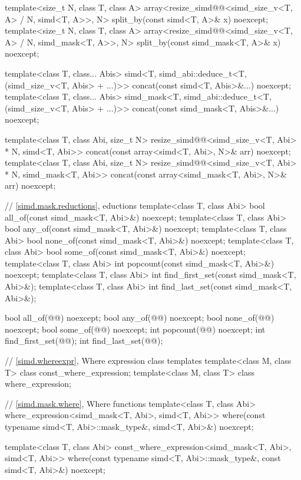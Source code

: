 \begin{codeblock}
{  template<size_t N, class T, class A>
    array<resize_simd@@<simd_size_v<T, A> / N, simd<T, A>>, N>
      split_by(const simd<T, A>& x) noexcept;
  template<size_t N, class T, class A>
    array<resize_simd@@<simd_size_v<T, A> / N, simd_mask<T, A>>, N>
      split_by(const simd_mask<T, A>& x) noexcept;

  template<class T, class... Abis>
    simd<T, simd_abi::deduce_t<T, (simd_size_v<T, Abis> + ...)>>
      concat(const simd<T, Abis>&...) noexcept;
  template<class T, class... Abis>
    simd_mask<T, simd_abi::deduce_t<T, (simd_size_v<T, Abis> + ...)>>
      concat(const simd_mask<T, Abis>&...) noexcept;

  template<class T, class Abi, size_t N>
    resize_simd@@<simd_size_v<T, Abi> * N, simd<T, Abi>>
      concat(const array<simd<T, Abi>, N>& arr) noexcept;
  template<class T, class Abi, size_t N>
    resize_simd@@<simd_size_v<T, Abi> * N, simd_mask<T, Abi>>
      concat(const array<simd_mask<T, Abi>, N>& arr) noexcept;

  // \ref{simd.mask.reductions}, eductions
  template<class T, class Abi> bool all_of(const simd_mask<T, Abi>&) noexcept;
  template<class T, class Abi> bool any_of(const simd_mask<T, Abi>&) noexcept;
  template<class T, class Abi> bool none_of(const simd_mask<T, Abi>&) noexcept;
  template<class T, class Abi> bool some_of(const simd_mask<T, Abi>&) noexcept;
  template<class T, class Abi> int popcount(const simd_mask<T, Abi>&) noexcept;
  template<class T, class Abi> int find_first_set(const simd_mask<T, Abi>&);
  template<class T, class Abi> int find_last_set(const simd_mask<T, Abi>&);

  bool all_of(@@) noexcept;
  bool any_of(@@) noexcept;
  bool none_of(@@) noexcept;
  bool some_of(@@) noexcept;
  int popcount(@@) noexcept;
  int find_first_set(@@);
  int find_last_set(@@);

  // \ref{simd.whereexpr}, Where expression class templates
  template<class M, class T> class const_where_expression;
  template<class M, class T> class where_expression;

  // \ref{simd.mask.where}, Where functions
  template<class T, class Abi>
    where_expression<simd_mask<T, Abi>, simd<T, Abi>>
      where(const typename simd<T, Abi>::mask_type&, simd<T, Abi>&) noexcept;

  template<class T, class Abi>
    const_where_expression<simd_mask<T, Abi>, simd<T, Abi>>
      where(const typename simd<T, Abi>::mask_type&, const simd<T, Abi>&) noexcept;

}
\end{codeblock}
